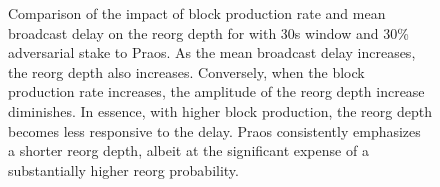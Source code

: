 \begin{figure}[htbp!]
\caption{Comparison of the impact of block production rate and mean broadcast delay on the reorg depth for \ProjBase with 30s window and 30\% adversarial stake to Praos. As the mean broadcast delay increases, the reorg depth also increases. Conversely, when the block production rate increases, the amplitude of the reorg depth increase diminishes. In essence, with higher block production, the reorg depth becomes less responsive to the delay. Praos consistently emphasizes a shorter reorg depth, albeit at the significant expense of a substantially higher reorg probability.}
\label{fig:c2-delay}
\end{figure}

%
%    



